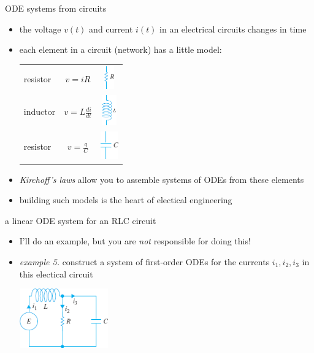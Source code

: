 \documentclass[urlcolor=blue,dvipsnames]{beamer}
\begin{document}
\begin{frame}{ODE systems from circuits}

\begin{itemize}
\item the voltage $v(t)$ and current $i(t)$ in an electrical circuits changes in time
\item each element in a circuit (network) has a little model:

\begin{tabular}{lcc}
resistor & $v = iR$ & \includegraphics[height=10mm,trim=0 3mm 0 -3mm]{figs/circuit-element-R} \\
inductor & $v = L \frac{di}{dt}$ & \includegraphics[height=13mm,trim=0 5mm 0 -5mm]{figs/circuit-element-L} \\
resistor & $v = \frac{q}{C}$ & \includegraphics[height=12mm,trim=0 5mm 0 -5mm]{figs/circuit-element-C}
\end{tabular}

\bigskip \bigskip
\item \emph{Kirchoff's laws} allow you to assemble systems of ODEs from these elements
\item building such models is the heart of electical engineering
\end{itemize}
\end{frame}


\begin{frame}{a linear ODE system for an RLC circuit}

\begin{itemize}
\item I'll do an example, but you are \emph{not} responsible for doing this!
\item \emph{example 5.} construct a system of first-order ODEs for the currents $i_1,i_2,i_3$ in this electical circuit

\bigskip
\includegraphics[width=0.3\textwidth]{figs/new-rlc-circuit}
\end{itemize}

\vspace{30mm}
\end{frame}
\end{document}
